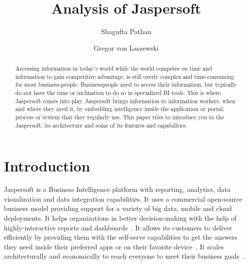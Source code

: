 \title{Analysis of Jaspersoft}


\author{Shagufta Pathan}

\author{Gregor von Laszewski}


\renewcommand{\shortauthors}{G. v. Laszewski}


\begin{abstract}
Accessing information in today's world while the world competes on time and
information to gain competitive advantage, is still overly complex and
time-consuming for most business-people. Businesspeople need to access their
information, but typically do not have the time or inclination to do so in
specialized BI tools. This is where Jaspersoft comes into play. Jaspersoft
brings information to information workers, when and where they need it, by
embedding intelligence inside the application or portal, process or system that
they regularly use. This paper tries to introduce you to the Jaspersoft, its
architecture and some of its features and capabilities. 
\end{abstract}


\maketitle

\section{Introduction}
Jaspersoft is a Business Intelligence platform with reporting, analytics, data
visualization and data integration capabilities. It uses a commercial
open-source business model providing support for a variety of big data, mobile
and cloud deployments. It helps organizations in better decision-making with the
help of highly-interactive reports and
dashboards~\cite{hid-sp18-516-www-finances-online}. It allows its customers to
deliver efficiently by providing them with the self-serve capabilities to get
the answers they need inside their preferred apps or on their favorite
device~\cite{hid-sp18-516-www-jaspersoft-overview}. It scales architecturally
and economically to reach everyone to meet their business
goals~\cite{hid-sp18-516-www-finances-online}. 

